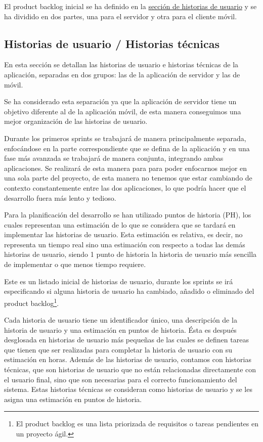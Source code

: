 El product backlog inicial se ha definido en la \hyperref[sec:historias-de-usuario]{sección de historias de usuario} y se ha dividido en dos partes, una para el servidor y otra para el cliente móvil.

\subsection{Historias de usuario / Historias técnicas}
\label{sec:historias-de-usuario}
En esta sección se detallan las historias de usuario e historias técnicas de la aplicación, separadas en dos grupos: las de la aplicación de servidor y las de móvil.

Se ha considerado esta separación ya que la aplicación de servidor tiene un objetivo diferente al de la aplicación móvil, de esta manera conseguimos una mejor organización de las historias de usuario.

Durante los primeros sprints se trabajará de manera principalmente separada, enfocándose en la parte correspondiente que se defina de la aplicación y en una fase más avanzada se trabajará de manera conjunta, integrando ambas aplicaciones. Se realizará de esta manera para para poder enfocarnos mejor en una sola parte del proyecto, de esta manera no tenemos que estar cambiando de contexto constantemente entre las dos aplicaciones, lo que podría hacer que el desarrollo fuera más lento y tedioso.

Para la planificación del desarrollo se han utilizado puntos de historia (PH), los cuales representan una estimación de lo que se considera que se tardará en implementar las historias de usuario. Esta estimación es relativa, es decir, no representa un tiempo real sino una estimación con respecto a todas las demás historias de usuario, siendo 1 punto de historia la historia de usuario más sencilla de implementar o que menos tiempo requiere.

Este es un listado inicial de historias de usuario, durante los sprints se irá especificando si alguna historia de usuario ha cambiado, añadido o eliminado del product backlog\footnote{El product backlog es una lista priorizada de requisitos o tareas pendientes en un proyecto ágil.}.

Cada historia de usuario tiene un identificador único, una descripción de la historia de usuario y una estimación en puntos de historia. Ésta es después desglosada en historias de usuario más pequeñas de las cuales se definen tareas que tienen que ser realizadas para completar la historia de usuario con su estimación en horas.
Además de las historias de usuario, contamos con historias técnicas, que son historias de usuario que no están relacionadas directamente con el usuario final, sino que son necesarias para el correcto funcionamiento del sistema. Estas historias técnicas se consideran como historias de usuario y se les asigna una estimación en puntos de historia.

